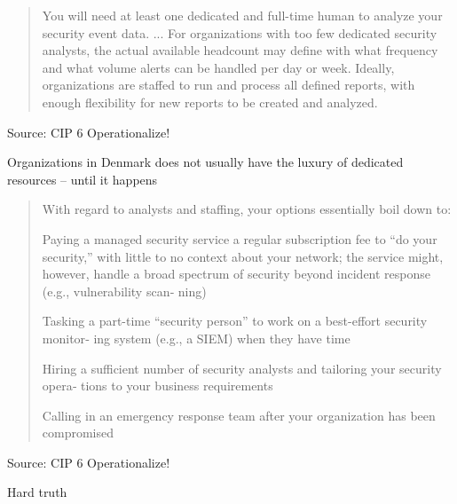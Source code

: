 \documentclass[Screen16to9,17pt]{foils}
\begin{document}
\begin{quote}
You will need at least one dedicated and full-time human to analyze your security event data.
  ...
For organizations with too few dedicated security analysts, the actual available headcount may define with what frequency and what volume alerts can be handled per day or week. Ideally, organizations are staffed to run and process all defined reports, with enough flexibility for new reports to be created and analyzed.
\end{quote}
Source: CIP 6 Operationalize!

\begin{list2}
\item Organizations in Denmark does not usually have the luxury of dedicated resources -- until it happens
\end{list2}



\begin{quote}

With regard to analysts and staffing, your options essentially boil down to:
\begin{list2}
\item Paying a managed security service a regular subscription fee to “do your security,”
  with little to no context about your network; the service might, however, handle a
  broad spectrum of security beyond incident response (e.g., vulnerability scan‐
  ning)
\item Tasking a part-time “security person” to work on a best-effort security monitor‐
  ing system (e.g., a SIEM) when they have time
\item Hiring a sufficient number of security analysts and tailoring your security opera‐
tions to your business requirements
\item Calling in an emergency response team after your organization has been compromised
\end{list2}
\end{quote}
Source: CIP 6 Operationalize!

\begin{list2}
  \item Hard truth
\end{list2}





\begin{quote}

\end{quote}
\end{document}
